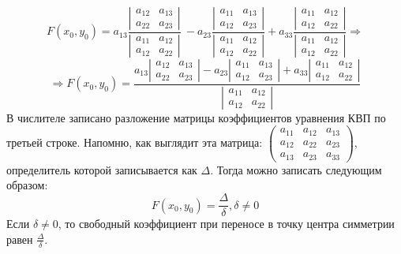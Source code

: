 $$F(x_0, y_0) = a_{13}  \frac{\left| \begin{array}{cccc}
	a_{12} & a_{13}\\
	a_{22} & a_{23}
\end{array}\right|}{\left| \begin{array}{cccc}
	a_{11} & a_{12}\\
	a_{12} & a_{22}
\end{array}\right|} \ - a_{23} \frac{\left| \begin{array}{cccc}
	a_{11} & a_{13}\\
	a_{12} & a_{23}
\end{array}\right|}{\left| \begin{array}{cccc}
	a_{11} & a_{12}\\
	a_{12} & a_{22}
\end{array}\right|} + a_{33} \frac{\left| \begin{array}{cccc}
	a_{11} & a_{12}\\
	a_{12} & a_{22}
\end{array}\right|}{\left| \begin{array}{cccc}
	a_{11} & a_{12}\\
	a_{12} & a_{22}
	\end{array}\right|} \Rightarrow$$
$$\Rightarrow F(x_0, y_0) = \frac{a_{13}  \left| \begin{array}{cccc}
	a_{12} & a_{13}\\
	a_{22} & a_{23}
\end{array}\right| - a_{23} \left| \begin{array}{cccc}
	a_{11} & a_{13}\\
	a_{12} & a_{23}
\end{array}\right| + a_{33} \left| \begin{array}{cccc}
	a_{11} & a_{12}\\
	a_{12} & a_{22}
\end{array}\right|}{\left| \begin{array}{cccc}
	a_{11} & a_{12}\\
	a_{12} & a_{22}
\end{array}\right|}$$
В числителе записано разложение матрицы коэффициентов уравнения КВП по третьей строке. Напомню, как выглядит эта матрица: 
$\left( \begin{array}{cccc}
    a_{11} & a_{12} & a_{13}\\
    a_{12} & a_{22} & a_{23} \\
    a_{13} & a_{23} & a_{33}
\end{array}\right)$, определитель которой записывается как $\Delta$. Тогда можно записать следующим образом:
$$F(x_0, y_0) = \frac{\Delta}{\delta}, \delta \neq 0 $$
Если $\delta \neq 0$, то свободный коэффициент при переносе в точку центра симметрии равен $\frac{\Delta}{\delta}$.


